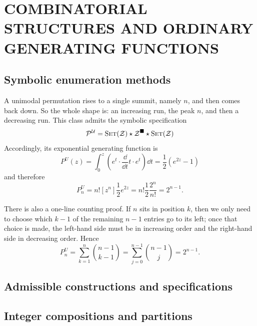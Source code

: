 \chapter{COMBINATORIAL STRUCTURES AND ORDINARY GENERATING FUNCTIONS}
\label{chap:combinatorial structures and ordinary generating functions}

\section{Symbolic enumeration methods}

A unimodal permutation rises to a single summit, namely $n$, and then comes back down.
So the whole shape is: an increasing run, the peak $n$, and then a decreasing run.
This class admits the symbolic specification
\begin{equation*}
    \mathcal{P}^{\mathcal{U}} = \mathrm{S}\textsc{et}(\mathcal{Z}) \star \mathcal{Z}^{\blacksquare} \star \mathrm{S}\textsc{et}(\mathcal{Z})
\end{equation*}
Accordingly, its exponential generating function is
\begin{equation*}
    P^{U}(z) = \int_{0}^{z}\left(e^{t} \cdot \frac{\dd}{\dd t} t \cdot e^{t}\right)\dd t = \frac{1}{2}(e^{2z} - 1)
\end{equation*}
and therefore
\begin{equation*}
    P^{U}_{n} = n![z^{n}] \frac{1}{2} e^{2z} = n!\frac{1}{2} \frac{2^{n}}{n!} = 2^{n - 1}.
\end{equation*}

There is also a one-line counting proof. If $n$ sits in position $k$, then we only need to choose which
$k-1$ of the remaining $n-1$ entries go to its left; once that choice is made, the left-hand side must be
in increasing order and the right-hand side in decreasing order. Hence
\begin{equation*}
    P^{U}_{n} = \sum_{k = 1}^{n} \binom{n - 1}{k - 1}
    = \sum_{j = 0}^{n - 1} \binom{n - 1}{j}
    = 2^{n - 1}.
\end{equation*}

\section{Admissible constructions and specifications}

\section{Integer compositions and partitions}

